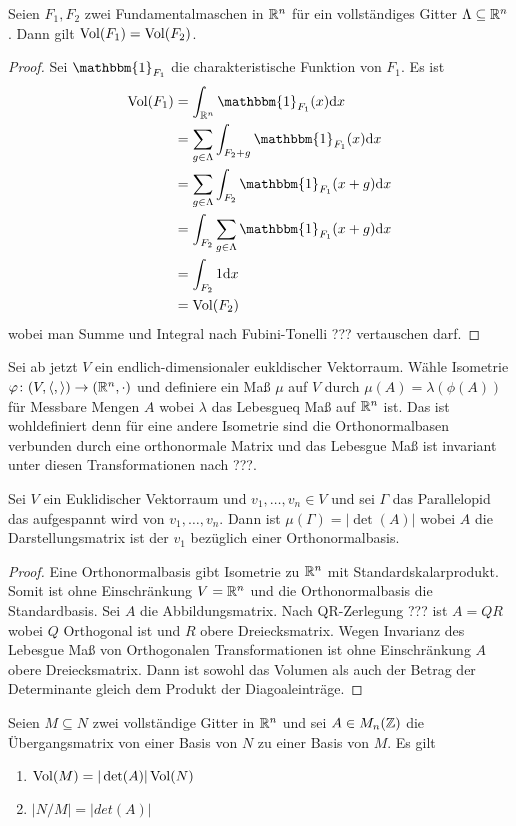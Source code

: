 \begin{Lemma}
	Seien \(F_1,F_2\) zwei Fundamentalmaschen in \(\mathbb{R}^n\) für ein vollständiges Gitter \(\Lambda\subseteq \mathbb{R}^n\).
	Dann gilt \(\operatorname{Vol}(F_1)=\operatorname{Vol}(F_2)\).
\end{Lemma}
\begin{proof}
	Sei \(\mathbbm{1}_{F_1}\) die charakteristische Funktion von \(F_1\).
	Es ist 
	\begin{align*}
	\Vol(F_1)&=\int_{\RR^n}\mathbbm{1}_{F_1}(x)\text{d}x\\
	&=\sum_{g\in\Lambda}\int_{F_2+g}\mathbbm{1}_{F_1}(x)\text{d}x\\
	&=\sum_{g\in\Lambda}\int_{F_2}\mathbbm{1}_{F_1}(x+g)\text{d}x\\
	&=\int_{F_2}\sum_{g\in\Lambda}\mathbbm{1}_{F_1}(x+g)\text{d}x\\
	&=\int_{F_2}1\text{d}x\\
	&=\Vol(F_2)
	\end{align*} wobei man Summe und Integral nach Fubini-Tonelli ??? vertauschen darf.
\end{proof}
Sei ab jetzt \(V\) ein endlich-dimensionaler eukldischer Vektorraum. Wähle Isometrie \(\varphi\colon (V,\langle , \rangle)\to (\mathbb{R}^n,\cdot)\)
und definiere ein Maß \(\mu\) auf \(V\) durch \(\mu(A)=\lambda(\phi(A))\) für Messbare Mengen \(A\) wobei \(\lambda\) das Lebesgueq Maß auf \(\mathbb{R}^n\) ist. Das ist wohldefiniert denn für eine andere Isometrie sind die Orthonormalbasen verbunden durch eine orthonormale Matrix und das Lebesgue Maß ist invariant unter diesen Transformationen nach ???.
\begin{Lemma}
	Sei \(V\) ein Euklidischer Vektorraum und \(v_1,\dots,v_n\in V\) und sei \(\Gamma\) das Parallelopid das aufgespannt wird von \(v_1,\dots,v_n\).
	Dann ist \(\mu(\Gamma)=|\det(A)|\) wobei \(A\) die Darstellungsmatrix ist der \(v_1\) bezüglich einer Orthonormalbasis.
\end{Lemma}
\begin{proof}
	Eine Orthonormalbasis gibt Isometrie zu \(\mathbb{R}^n\) mit Standardskalarprodukt. Somit ist ohne Einschränkung \(V=\mathbb{R}^n\) und die Orthonormalbasis die Standardbasis.
	Sei \(A\) die Abbildungsmatrix. Nach QR-Zerlegung ???
	ist \(A=QR\) wobei \(Q\) Orthogonal ist und \(R\) obere Dreiecksmatrix. Wegen Invarianz des Lebesgue Maß von Orthogonalen Transformationen ist ohne Einschränkung \(A\)
	obere Dreiecksmatrix. Dann ist sowohl das Volumen als auch der Betrag der Determinante gleich dem Produkt der Diagoaleinträge.
\end{proof}
\begin{Lemma}
	Seien \(M\subseteq N\) zwei vollständige Gitter in \(\mathbb{R}^n\) und sei \(A\in M_n(\mathbb{Z})\) die Übergangsmatrix von einer Basis von \(N\) zu einer Basis von \(M\).
	Es gilt
	\begin{enumerate}
		\item \(\operatorname{Vol}(M)=|\det(A)|\operatorname{Vol}(N)\)
		\item \(|N/M|=|det(A)|\)
	\end{enumerate}
\end{Lemma}
